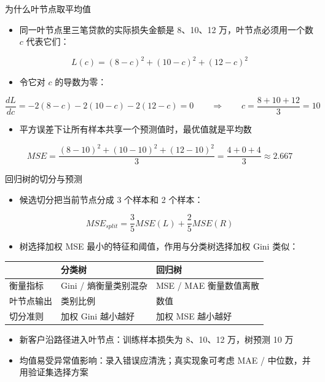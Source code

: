 \documentclass[10pt,aspectratio=43]{beamer}
\begin{document}
\begin{frame}{为什么叶节点取平均值}
  \begin{itemize}
    \item 同一叶节点里三笔贷款的实际损失金额是 8、10、12 万，叶节点必须用一个数 $c$ 代表它们：
  \end{itemize}
  \[
    L(c)=(8-c)^2+(10-c)^2+(12-c)^2
  \]
  \begin{itemize}
    \item 令它对 $c$ 的导数为零：
  \end{itemize}
  \[
    \frac{dL}{dc}=-2(8-c)-2(10-c)-2(12-c)=0
    \qquad\Longrightarrow\qquad
    c=\frac{8+10+12}{3}=10
  \]
  \begin{itemize}
    \item 平方误差下让所有样本共享一个预测值时，最优值就是平均数
  \end{itemize}
  \[
    MSE=\frac{(8-10)^2+(10-10)^2+(12-10)^2}{3}=\frac{4+0+4}{3}\approx 2.667
  \]
\end{frame}

\begin{frame}{回归树的切分与预测}
  \begin{itemize}
    \item 候选切分把当前节点分成 3 个样本和 2 个样本：
  \end{itemize}
  \[
    MSE_{split}=\frac35MSE(L)+\frac25MSE(R)
  \]
  \begin{itemize}
    \item 树选择加权 MSE 最小的特征和阈值，作用与分类树选择加权 Gini 类似：
  \end{itemize}
  \begin{center}
  \begin{tabular}{lll}
    \toprule
    & 分类树 & 回归树 \\
    \midrule
    衡量指标 & Gini / 熵衡量类别混杂 & MSE / MAE 衡量数值离散 \\
    叶节点输出 & 类别比例 & 数值 \\
    切分准则 & 加权 Gini 越小越好 & 加权 MSE 越小越好 \\
    \bottomrule
  \end{tabular}
  \end{center}
  \begin{itemize}
    \item 新客户沿路径进入叶节点：训练样本损失为 8、10、12 万，树预测 10 万
    \item 均值易受异常值影响：录入错误应清洗；真实现象可考虑 MAE / 中位数，并用验证集选择方案
  \end{itemize}
\end{frame}
\end{document}
